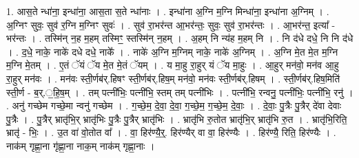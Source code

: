 \documentclass[17pt]{extarticle}
\begin{document}
1. आस॒ते न्धा॑ना॒ इन्धा॑ना॒ आस॒ता स॒ते न्धा॑नाः । . इन्धा॑ना अ॒ग्नि म॒ग्नि मिन्धा॑ना॒ इन्धा॑ना अ॒ग्निम् । . अ॒ग्निꣳ सुवः॒ सुव॑ र॒ग्नि म॒ग्निꣳ सुवः॑ । . सुव॑ रा॒भर॑न्त आ॒भर॑न्तः॒ सुवः॒ सुव॑ रा॒भर॑न्तः । . आ॒भर॑न्त॒ इत्या᳚ - भर॑न्तः । . तस्मि॑न् न॒ह म॒हम् तस्मिꣳ॒॒ स्तस्मि॑न् न॒हम् । . अ॒हम् नि न्य॑ह म॒हम् नि । . नि द॑धे दधे॒ नि नि द॑धे । . द॒धे॒ नाके॒ नाके॑ दधे दधे॒ नाके᳚ । . नाके॑ अ॒ग्नि म॒ग्निम् नाके॒ नाके॑ अ॒ग्निम् । . अ॒ग्नि मे॒त मे॒त म॒ग्नि म॒ग्नि मे॒तम् । . ए॒तं ॅयं ॅय मे॒त मे॒तं ॅयम् । . य मा॒हु रा॒हुर् यं ॅय मा॒हुः । . आ॒हुर् मन॑वो॒ मन॑व आ॒हु रा॒हुर् मन॑वः । . मन॑वः स्ती॒र्णब॑र्.हिषꣳ स्ती॒र्णब॑र्.हिष॒म् मन॑वो॒ मन॑वः स्ती॒र्णब॑र्.हिषम् । . स्ती॒र्णब॑र्.हिष॒मिति॑ स्ती॒र्ण - ब॒र्.॒हि॒ष॒म् । . तम् पत्नी॑भिः॒ पत्नी॑भि॒ स्तम् तम् पत्नी॑भिः । . पत्नी॑भि॒ रन्वनु॒ पत्नी॑भिः॒ पत्नी॑भि॒ रनु॑ । . अनु॑ गच्छेम गच्छे॒मा न्वनु॑ गच्छेम । . ग॒च्छे॒म॒ दे॒वा॒ दे॒वा॒ ग॒च्छे॒म॒ ग॒च्छे॒म॒ दे॒वाः॒ । . दे॒वाः॒ पु॒त्रैः पु॒त्रैर् दे॑वा देवाः पु॒त्रैः । . पु॒त्रैर् भ्रातृ॑भि॒र् भ्रातृ॑भिः पु॒त्रैः पु॒त्रैर् भ्रातृ॑भिः । . भ्रातृ॑भि रु॒तोत भ्रातृ॑भि॒र् भ्रातृ॑भि रु॒त । . भ्रातृ॑भि॒रिति॒ भ्रातृ॑ - भिः॒ । . उ॒त वा॑ वो॒तोत वा᳚ । . वा॒ हिर॑ण्यै॒र्॒. हिर॑ण्यैर् वा वा॒ हिर॑ण्यैः । . हिर॑ण्यै॒ रिति॒ हिर॑ण्यैः । . नाक॑म् गृह्णा॒ना गृ॑ह्णा॒ना नाक॒म् नाक॑म् गृह्णा॒नाः । \newline
\end{document}

